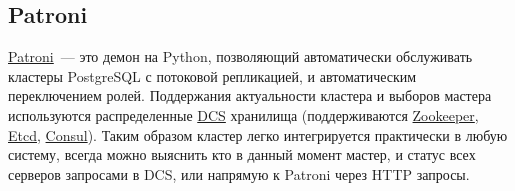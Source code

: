 \subsection{Patroni}

\href{https://github.com/zalando/patroni}{Patroni}~--- это демон на Python, позволяющий автоматически обслуживать кластеры PostgreSQL с потоковой репликацией, и автоматическим переключением ролей. Поддержания актуальности кластера и выборов мастера используются распределенные \href{https://en.wikipedia.org/wiki/Distributed_control_system}{DCS} хранилища (поддерживаются \href{https://zookeeper.apache.org/}{Zookeeper}, \href{https://coreos.com/etcd}{Etcd}, \href{https://www.consul.io/}{Consul}). Таким образом кластер легко интегрируется практически в любую систему, всегда можно выяснить кто в данный момент мастер, и статус всех серверов запросами в DCS, или напрямую к Patroni через HTTP запросы.
